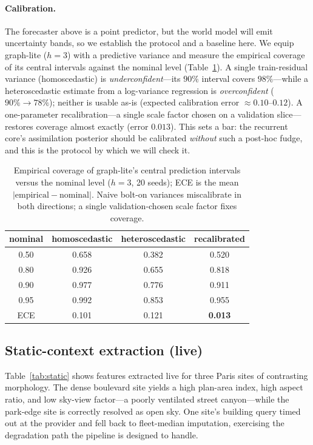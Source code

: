 \documentclass[10pt]{article}
\begin{document}
\paragraph{Calibration.}
The forecaster above is a point predictor, but the world model will emit
uncertainty bands, so we establish the protocol and a baseline here. We equip
graph-lite ($h=3$) with a predictive variance and measure the empirical coverage
of its central intervals against the nominal level (Table~\ref{tab:calib}). A
single train-residual variance (homoscedastic) is \emph{underconfident}---its
$90\%$ interval covers $98\%$---while a heteroscedastic estimate from a
log-variance regression is \emph{overconfident} ($90\%\!\to\!78\%$); neither is
usable as-is (expected calibration error $\approx0.10$--$0.12$). A one-parameter
recalibration---a single scale factor chosen on a validation slice---restores
coverage almost exactly (error $0.013$). This sets a bar: the recurrent core's
assimilation posterior should be calibrated \emph{without} such a post-hoc fudge,
and this is the protocol by which we will check it.

\begin{table}[t]
\centering
\small
\begin{tabular}{@{}cccc@{}}
\toprule
nominal & homoscedastic & heteroscedastic & recalibrated \\
\midrule
0.50 & 0.658 & 0.382 & 0.520 \\
0.80 & 0.926 & 0.655 & 0.818 \\
0.90 & 0.977 & 0.776 & 0.911 \\
0.95 & 0.992 & 0.853 & 0.955 \\
\midrule
ECE & 0.101 & 0.121 & \textbf{0.013} \\
\bottomrule
\end{tabular}
\caption{Empirical coverage of graph-lite's central prediction intervals versus
the nominal level ($h=3$, 20 seeds); ECE is the mean $|\text{empirical}-\text{nominal}|$. Naive bolt-on variances miscalibrate in both directions; a single
validation-chosen scale factor fixes coverage.}
\label{tab:calib}
\end{table}

\subsection{Static-context extraction (live)}
Table~\ref{tab:static} shows features extracted live for three Paris sites of
contrasting morphology. The dense boulevard site yields a high plan-area index,
high aspect ratio, and low sky-view factor---a poorly ventilated street
canyon---while the park-edge site is correctly resolved as open sky. One site's
building query timed out at the provider and fell back to fleet-median imputation,
exercising the degradation path the pipeline is designed to handle.
\end{document}
